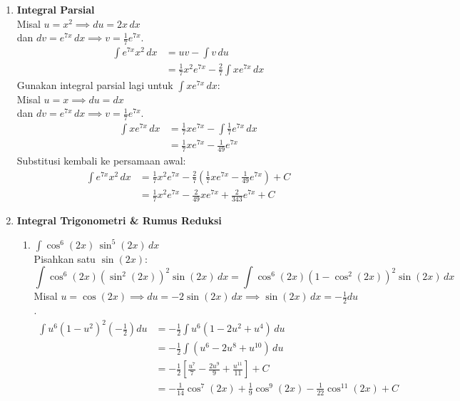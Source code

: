 \documentclass[a4paper,12pt]{article}
\begin{document}
\begin{enumerate}
  \item \textbf{Integral Parsial} \\
        Misal $u = x^2 \implies du = 2x\,dx$ \\
        dan $dv = e^{7x}\,dx \implies v = \frac{1}{7}e^{7x}$.
        \begin{align*}
          \int e^{7x}x^2\,dx &= uv - \int v\,du \\
          &= \frac{1}{7}x^2 e^{7x} - \frac{2}{7}\int x e^{7x}\,dx
        \end{align*}
        Gunakan integral parsial lagi untuk $\int x e^{7x}\,dx$: \\
        Misal $u = x \implies du = dx$ \\
        dan $dv = e^{7x}\,dx \implies v = \frac{1}{7}e^{7x}$.
        \begin{align*}
          \int x e^{7x}\,dx &= \frac{1}{7}x e^{7x} - \int \frac{1}{7}e^{7x}\,dx \\
          &= \frac{1}{7}x e^{7x} - \frac{1}{49}e^{7x}
        \end{align*}
        Substitusi kembali ke persamaan awal:
        \begin{align*}
          \int e^{7x}x^2\,dx &= \frac{1}{7}x^2 e^{7x} - \frac{2}{7}\left( \frac{1}{7}x e^{7x} - \frac{1}{49}e^{7x} \right) + C \\
          &= \frac{1}{7}x^2 e^{7x} - \frac{2}{49}x e^{7x} + \frac{2}{343}e^{7x} + C
        \end{align*}

  \item \textbf{Integral Trigonometri \& Rumus Reduksi}
        \begin{enumerate}
          \item[(a)] $\int \cos^6(2x)\,\sin^5(2x)\,dx$ \\
                Pisahkan satu $\sin(2x)$:
                \[ \int \cos^6(2x)(\sin^2(2x))^2 \sin(2x)\,dx = \int \cos^6(2x)(1-\cos^2(2x))^2 \sin(2x)\,dx \]
                Misal $u = \cos(2x) \implies du = -2\sin(2x)\,dx \implies \sin(2x)\,dx = -\frac{1}{2}du$.
                \begin{align*}
                  \int u^6(1-u^2)^2 \left(-\frac{1}{2}\right)du &= -\frac{1}{2} \int u^6(1 - 2u^2 + u^4)\,du \\
                  &= -\frac{1}{2} \int (u^6 - 2u^8 + u^{10})\,du \\
                  &= -\frac{1}{2} \left[ \frac{u^7}{7} - \frac{2u^9}{9} + \frac{u^{11}}{11} \right] + C \\
                  &= -\frac{1}{14}\cos^7(2x) + \frac{1}{9}\cos^9(2x) - \frac{1}{22}\cos^{11}(2x) + C
                \end{align*}


\end{enumerate}
\end{enumerate}
\end{document}

